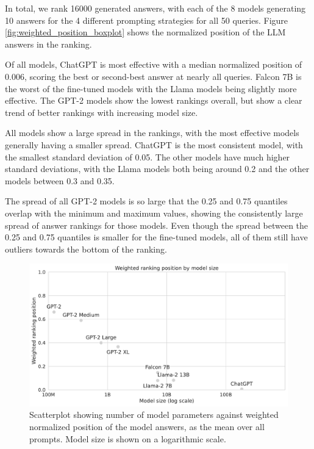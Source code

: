 In total, we rank 16000 generated answers, with each of the 8 models generating 10 answers for the 4 different prompting strategies for all 50 queries.
Figure \ref{fig:weighted_position_boxplot} shows the normalized position of the LLM answers in the ranking.

Of all models, ChatGPT is most effective with a median normalized position of 0.006, scoring the best or second-best answer at nearly all queries.
Falcon 7B is the worst of the fine-tuned models with the Llama models being slightly more effective.
The GPT-2 models show the lowest rankings overall, but show a clear trend of better rankings with increasing model size.

All models show a large spread in the rankings, with the most effective models generally having a smaller spread.
ChatGPT is the most consistent model, with the smallest standard deviation of 0.05.
The other models have much higher standard deviations, with the Llama models both being around 0.2 and the other models between 0.3 and 0.35.

The spread of all GPT-2 models is so large that the 0.25 and 0.75 quantiles overlap with the minimum and maximum values, showing the consistently large spread of answer rankings for those models.
Even though the spread between the 0.25 and 0.75 quantiles is smaller for the fine-tuned models, all of them still have outliers towards the bottom of the ranking.
\begin{figure}[t]
    \centering
    \includegraphics[width=\textwidth]{images/weighted_position_vs_model_size.pdf}
    \caption{Scatterplot showing number of model parameters against weighted normalized position of the model answers, as the mean over all prompts. Model size is shown on a logarithmic scale.}
    \label{fig:weighted_position_vs_model_size}
\end{figure}

